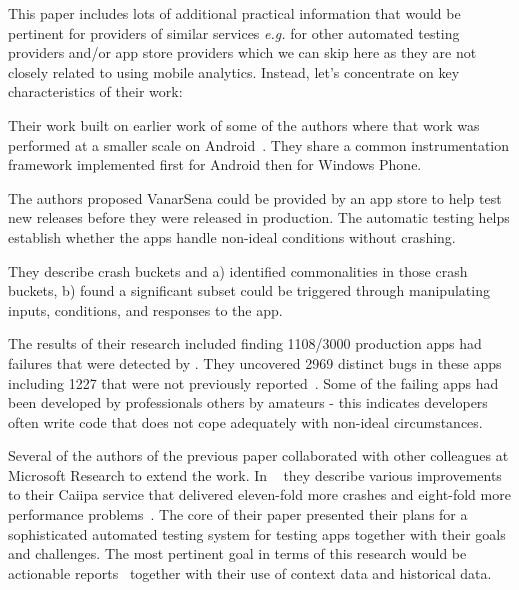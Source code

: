 This paper includes lots of additional practical information that would be pertinent for providers of similar services \emph{e.g.} for other automated testing providers and/or app store providers which we can skip here as they are not closely related to using mobile analytics. Instead, let's concentrate on key characteristics of their work:

Their work built on earlier work of some of the authors where that work was performed at a smaller scale on Android~. They share a common instrumentation framework implemented first for Android then for Windows Phone.

The authors proposed VanarSena could be provided by an app store to help test new releases before they were released in production. The automatic testing helps establish whether the apps handle non-ideal conditions without crashing.
    
They describe crash buckets and a) identified commonalities in those crash buckets, b) found a significant subset could be triggered through manipulating inputs, conditions, and responses to the app.

The results of their research included finding 1108/3000 production  apps had failures that were detected by . They uncovered 2969 distinct bugs in these apps including 1227 that were not previously reported~. Some of the failing apps had been developed by professionals others by amateurs - this indicates developers often write code that does not cope adequately with non-ideal circumstances.  

\afterpage{\clearpage}

Several of the authors of the previous paper collaborated with other colleagues at Microsoft Research to extend the work. In ~\textcite{chandra2015_how_to_smash_the_next_billion_mobile_app_bugs} they describe various improvements to their Caiipa service that delivered eleven-fold more crashes and eight-fold more performance problems~\cite[pp. 37-38]{chandra2015_how_to_smash_the_next_billion_mobile_app_bugs}. The core of their paper presented their plans for a sophisticated automated testing system for testing  apps together with their goals and challenges. The most pertinent goal in terms of this research would be actionable reports~ together with their use of context data and historical data. 

